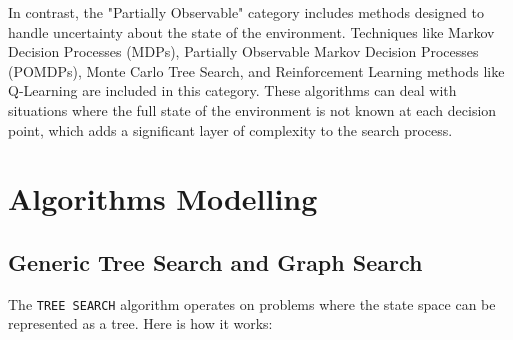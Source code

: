 \documentclass[a4paper,UKenglish,cleveref, autoref, thm-restate]{qlinhta}
\begin{document}
In contrast, the "Partially Observable" category includes methods designed to handle uncertainty about the state of the environment. Techniques like Markov Decision Processes (MDPs), Partially Observable Markov Decision Processes (POMDPs), Monte Carlo Tree Search, and Reinforcement Learning methods like Q-Learning are included in this category. These algorithms can deal with situations where the full state of the environment is not known at each decision point, which adds a significant layer of complexity to the search process.\\

\section{Algorithms Modelling}
\subsection{Generic Tree Search and Graph Search}
The \texttt{TREE SEARCH} algorithm operates on problems where the state space can be represented as a tree. Here is how it works:
\end{document}
